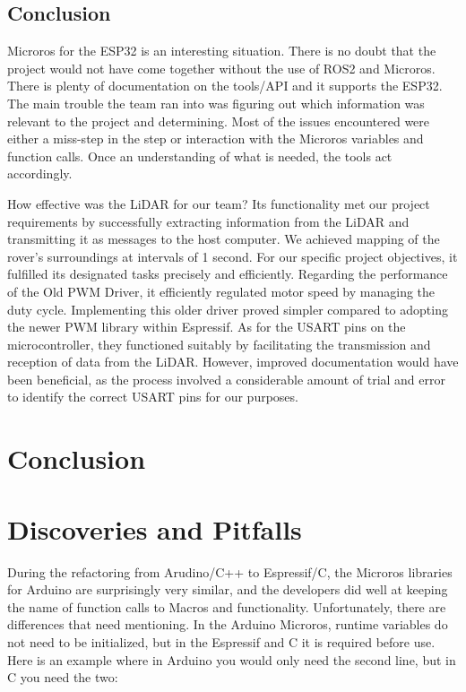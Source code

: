\documentclass[conference]{IEEEtran}
\begin{document}
\subsection{Conclusion}

Microros for the ESP32 is an interesting situation. There is no doubt that the project would not have come together without the use of ROS2 and Microros. There is plenty of documentation on the tools/API and it supports the ESP32. The main trouble the team ran into was figuring out which information was relevant to the project and determining. Most of the issues encountered were either a miss-step in the step or interaction with the Microros variables and function calls. Once an understanding of what is needed, the tools act accordingly.

How effective was the LiDAR for our team? Its functionality met our project requirements by successfully extracting information from the LiDAR and transmitting it as messages to the host computer. We achieved mapping of the rover's surroundings at intervals of 1 second. For our specific project objectives, it fulfilled its designated tasks precisely and efficiently.
Regarding the performance of the Old PWM Driver, it efficiently regulated motor speed by managing the duty cycle. Implementing this older driver proved simpler compared to adopting the newer PWM library within Espressif.
As for the USART pins on the microcontroller, they functioned suitably by facilitating the transmission and reception of data from the LiDAR. However, improved documentation would have been beneficial, as the process involved a considerable amount of trial and error to identify the correct USART pins for our purposes.


\section{Conclusion}

\section{Discoveries and Pitfalls}  
During the refactoring from Arudino/C++ to Espressif/C, the Microros libraries for Arduino are surprisingly very similar, and the developers did well at keeping the name of function calls to Macros and functionality. Unfortunately, there are differences that need mentioning. In the Arduino Microros, runtime variables do not need to be initialized, but in the Espressif and C it is required before use. Here is an example where in Arduino you would only need the second line, but in C you need the two:
\end{document}
